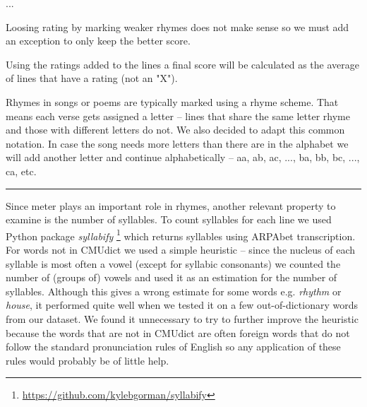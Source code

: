 ...

 Loosing rating by marking weaker rhymes does not make sense so we must add an exception to only keep the better score.

Using the ratings added to the lines a final score will be calculated as the average of lines that have a rating (not an "X").


 Rhymes in songs or poems are typically marked using a rhyme scheme. That means each verse gets assigned a letter -- lines that share the same letter rhyme and those with different letters do not. We also decided to adapt this common notation. In case the song needs more letters than there are in the alphabet we will add another letter and continue alphabetically -- aa, ab, ac, ..., ba, bb, bc, ..., ca, etc.


	
\noindent\rule{14cm}{0.4pt}

Since meter plays an important role in rhymes, another relevant property to examine is the number of syllables. To count syllables for each line we used Python package \textit{syllabify} \footnote{\url{https://github.com/kylebgorman/syllabify}} which returns syllables using ARPAbet transcription. For words not in CMUdict we used a simple heuristic -- since the nucleus of each syllable is most often a vowel (except for syllabic consonants) we counted the number of (groups of) vowels and used it as an estimation for the number of syllables. Although this gives a wrong estimate for some words e.g. \textit{rhythm} or \textit{house}, it performed quite well when we tested it on a few out-of-dictionary words from our dataset. We found it unnecessary to try to further improve the heuristic because the words that are not in CMUdict are often foreign words that do not follow the standard pronunciation rules of English so any application of these rules would probably be of little help.

